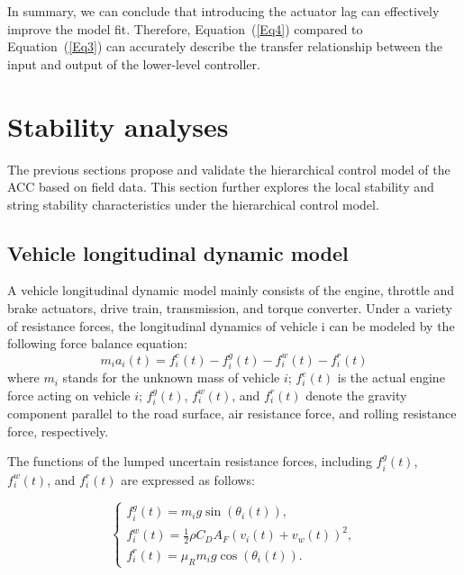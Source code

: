 \documentclass[journal]{IEEEtran}
\begin{document}
In summary, we can conclude that introducing the actuator lag can effectively improve the model fit. Therefore, Equation~(\ref{Eq4}) compared to Equation~(\ref{Eq3}) can accurately describe the transfer relationship between the input and output of the lower-level controller.






\section{Stability analyses}
\label{Section 4}

The previous sections propose and validate the hierarchical control model of the ACC based on field data. This section further explores the local stability and string stability characteristics under the hierarchical control model.

\subsection{Vehicle longitudinal dynamic model}
\label{Section 4.1}

A vehicle longitudinal dynamic model mainly consists of the engine, throttle and brake actuators, drive train, transmission, and torque converter. Under a variety of resistance forces, the longitudinal dynamics of vehicle i can be modeled by the following force balance equation:
\begin{equation}
  m_ia_i(t)=f_i^e(t)-f_i^g(t)-f_i^w(t)-f_i^r(t)
  \label{Eq13}
\end{equation}
where $m_i$ stands for the unknown mass of vehicle $i$; $f_i^e(t)$ is the actual engine force acting on vehicle $i$; $f_i^g(t)$, $f_i^w(t)$, and $f_i^r(t)$ denote the gravity component parallel to the road surface, air resistance force, and rolling resistance force, respectively.

The functions of the lumped uncertain resistance forces, including $f_i^g(t)$, $f_i^w(t)$, and $f_i^r(t)$ are expressed as follows:

\begin{equation}
  \left\{\begin{array}{l}
    f_{i}^{g}(t)=m_{i} g \sin \left(\theta_{i}(t)\right)  ,                       \\
    f_{i}^{w}(t)=\frac{1}{2} \rho C_{D} A_{F}\left(v_{i}(t)+v_{w}(t)\right)^{2} , \\
    f_{i}^{r}(t)=\mu_{R} m_{i} g \cos \left(\theta_{i}(t)\right).
  \end{array}\right.
  \label{Eq14}
\end{equation}
\end{document}
